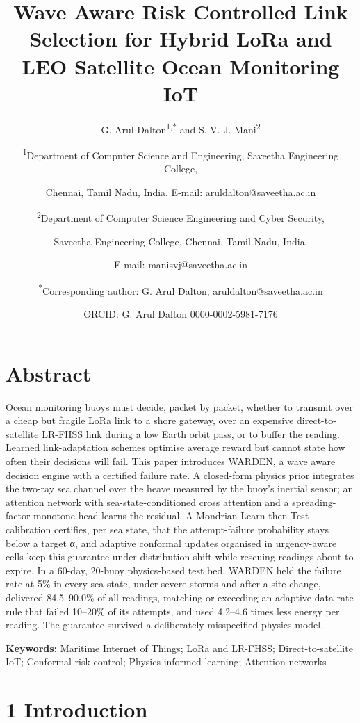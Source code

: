 \documentclass[
  11pt,
]{article}
\title{Wave Aware Risk Controlled Link Selection for Hybrid LoRa and LEO
Satellite Ocean Monitoring IoT}
\author{G. Arul Dalton\textsuperscript{1,*} and S. V. J.
Mani\textsuperscript{2} \and \textsuperscript{1}Department of Computer
Science and Engineering, Saveetha Engineering College, \and Chennai,
Tamil Nadu, India. E-mail:
aruldalton@saveetha.ac.in \and \textsuperscript{2}Department of Computer
Science Engineering and Cyber Security, \and Saveetha Engineering
College, Chennai, Tamil Nadu, India. \and E-mail:
manisvj@saveetha.ac.in \and \textsuperscript{*}Corresponding author: G.
Arul Dalton, aruldalton@saveetha.ac.in \and ORCID: G. Arul Dalton
0000-0002-5981-7176}
\date{}
\begin{document}
\maketitle

\hypertarget{abstract}{%
\section*{Abstract}\label{abstract}}

Ocean monitoring buoys must decide, packet by packet, whether to
transmit over a cheap but fragile LoRa link to a shore gateway, over an
expensive direct-to-satellite LR-FHSS link during a low Earth orbit
pass, or to buffer the reading. Learned link-adaptation schemes optimise
average reward but cannot state how often their decisions will fail.
This paper introduces WARDEN, a wave aware decision engine with a
certified failure rate. A closed-form physics prior integrates the
two-ray sea channel over the heave measured by the buoy's inertial
sensor; an attention network with sea-state-conditioned cross attention
and a spreading-factor-monotone head learns the residual. A Mondrian
Learn-then-Test calibration certifies, per sea state, that the
attempt-failure probability stays below a target α, and adaptive
conformal updates organised in urgency-aware cells keep this guarantee
under distribution shift while rescuing readings about to expire. In a
60-day, 20-buoy physics-based test bed, WARDEN held the failure rate at
5\% in every sea state, under severe storms and after a site change,
delivered 84.5--90.0\% of all readings, matching or exceeding an
adaptive-data-rate rule that failed 10--20\% of its attempts, and used
4.2--4.6 times less energy per reading. The guarantee survived a
deliberately misspecified physics model.

\textbf{Keywords:} Maritime Internet of Things; LoRa and LR-FHSS;
Direct-to-satellite IoT; Conformal risk control; Physics-informed
learning; Attention networks

\hypertarget{introduction}{%
\section{1 Introduction}\label{introduction}}
\end{document}
